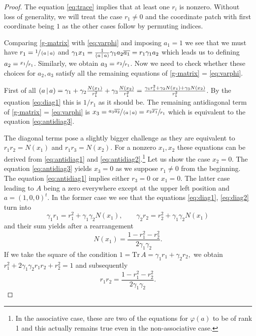 \begin{proof}
The equation \eqref{eq:trace} implies that at least one $r_i$ is nonzero. Without loss of generality, we will treat the case $r_1 \neq 0$ and the coordinate patch with first coordinate being $1$ as the other cases follow by permuting indices.

Comparing \eqref{g-matrix} with \eqref{eq:varphi} and imposing $a_1 = 1$ we see that we must have $r_1 =  \sfrac{1}{\left( a \,|\, a \right)}$ and $\gamma_1 x_1 = \frac{1}{\left( a \,|\, a \right)} \gamma_1 a_2 \overline{a_1} = r_1 \gamma_1 a_2$ which leads us to defining $a_2 = \sfrac{x_1}{r_1}$. Similarly, we obtain $a_3 = \sfrac{x_2}{r_1}$. Now we need to check whether these choices for $a_2, a_3$ satisfy all the remaining equations of \eqref{g-matrix} = \eqref{eq:varphi}.

First of all $\left( a \,|\, a \right) = \gamma_1 + \gamma_2 \frac{N(x_1)}{r_1^2} + \gamma_3\frac{N(x_2)}{r_1^2} = \frac{ \gamma_1 r_1^2+ \gamma_2N(x_1) + \gamma_3N(x_2)}{r_1^2}$. By the equation \eqref{eq:diag1} this is $1/r_1$ as it should be. The remaining antidiagonal term of \eqref{g-matrix} = \eqref{eq:varphi} is $x_3 = \sfrac{a_3\overline{a_2}}{\left( a \,|\, a \right)}  = \sfrac{ x_2\overline{x_1}}{r_1}$ which is equivalent to the equation \eqref{eq:antidiag3}.

The diagonal terms pose a slightly bigger challenge as they are equivalent to $r_1 r_2  = N(x_1)$ and $r_1 r_3 = N(x_2)$. For a nonzero $x_1, x_2$ these equations can be derived from \eqref{eq:antidiag1} and \eqref{eq:antidiag2}.\footnote{In the associative case, these are two of the equations for $\varphi(a)$ to be of rank 1 and this actually remains true even in the non-associative case.} Let us show the case $x_2 = 0$. The equation \eqref{eq:antidiag3} yields $x_3 = 0$ as we suppose $r_1 \neq 0$ from the beginning. The equation \eqref{eq:antidiag1} implies either $r_3 = 0$ or $x_1 = 0$. The latter case leading to $A$ being a zero everywhere except at the upper left position and $a = (1,0,0)^t$. In the former case we see that the equations \eqref{eq:diag1}, \eqref{eq:diag2} turn into 
\[
\gamma_1 r_1 = r_1^2 +  \gamma_1\gamma_2N(x_1), \qquad \gamma_2 r_2 = r_2^2 + \gamma_1\gamma_2 N(x_1)
\]
and their sum yields after a rearrangement 
\[
N(x_1) = \frac{1- r_1^2 - r_2^2}{2\gamma_1\gamma_2}.
\]
If we take the square of the  condition $1 = \mathrm{Tr}\, A = \gamma_1 r_1 + \gamma_2 r_2,$ we obtain $r_1^2 + 2\gamma_1\gamma_2 r_1 r_2 + r_2^2 = 1$ and subsequently 
\[
r_1r_2 = \frac{1-r_1^2 - r_2^2}{2\gamma_1\gamma_2}.
\]
\end{proof}

